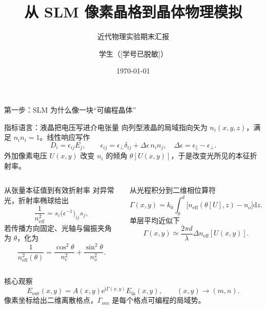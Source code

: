 \documentclass[UTF8,fontset=none,aspectratio=169,10pt]{ctexbeamer}
\title[SLM 人造晶格模拟]{从 SLM 像素晶格到晶体物理模拟}
\subtitle{近代物理实验期末汇报}
\author[学生]{学生（[学号已脱敏]）}
\institute[北京师范大学]{北京师范大学物理学系}
\date{\today}
\newcommand{\ii}{\mathrm{i}}
\newcommand{\dd}{\mathrm{d}}
\newcommand{\ee}{\mathrm{e}}
\newcommand{\Ein}{E_{\mathrm{in}}}
\newcommand{\Eout}{E_{\mathrm{out}}}
\begin{document}
\begin{frame}
  \titlepage
\end{frame}

\begin{frame}[t]{第一步：SLM 为什么像一块“可编程晶体”}
\scriptsize
\setlength{\abovedisplayskip}{2pt}
\setlength{\belowdisplayskip}{2pt}
\begin{block}{指标语言：液晶把电压写进介电张量}
向列型液晶的局域指向矢为 $n_i(x,y,z)$，满足 $n_i n_i=1$。线性响应写作
\[
D_i=\epsilon_{ij}E_j,\qquad
\epsilon_{ij}=\epsilon_{\perp}\delta_{ij}
+\Delta\epsilon\,n_i n_j ,
\quad
\Delta\epsilon=\epsilon_{\parallel}-\epsilon_{\perp}.
\]
外加像素电压 $U(x,y)$ 改变 $n_i$ 的倾角 $\theta[U(x,y)]$，于是改变光所见的本征折射率。
\end{block}

\begin{columns}[T,onlytextwidth]
\begin{block}{从张量本征值到有效折射率}
对异常光，折射率椭球给出
\[
\frac{1}{n_{\mathrm{eff}}^2}
=s_i\bigl(\epsilon^{-1}\bigr)_{ij}s_j ,
\]
若传播方向固定、光轴与偏振夹角为 $\theta$，化为
\[
\frac{1}{n_{\mathrm{eff}}^2(\theta)}
=\frac{\cos^2\theta}{n_e^2}
+\frac{\sin^2\theta}{n_o^2}.
\]
\end{block}

\begin{block}{从光程积分到二维相位算符}
\[
\Gamma(x,y)=k_0\!\int_0^d
\big[n_{\mathrm{eff}}(\theta[U],z)-n_o\big]\dd z .
\]
单层平均近似下
\[
\Gamma(x,y)\simeq
\frac{2\pi d}{\lambda}
\Delta n_{\mathrm{eff}}\!\left[U(x,y)\right].
\]
\end{block}
\end{columns}

\vspace{-0.4em}
\begin{alertblock}{核心观察}
\[
\Eout(x,y)=A(x,y)\ee^{\ii\Gamma(x,y)}\Ein(x,y),
\qquad (x,y)\rightarrow(m,n).
\]
像素坐标给出二维离散格点，$\Gamma_{mn}$ 是每个格点可编程的局域势。
\end{alertblock}
\end{frame}
\end{document}
